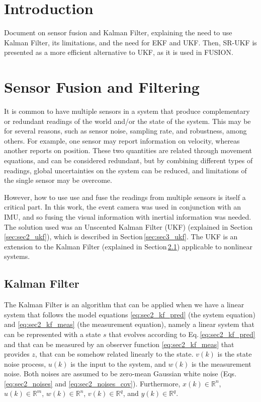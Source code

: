 \documentclass[10pt,twocolumn]{IEEEtran}
\begin{document}
\section{Introduction}

Document on sensor fusion and Kalman Filter, explaining the need to use Kalman Filter, its limitations, and the need for EKF and UKF. Then, SR-UKF is presented as a more efficient alternative to UKF, as it is used in FUSION.

\section{Sensor Fusion and Filtering}
\label{sec:sec_filtering}

It is common to have multiple sensors in a system that produce complementary or redundant readings of the world and/or the state of the system. This may be for several reasons, such as sensor noise, sampling rate, and robustness, among others. For example, one sensor may report information on velocity, whereas another reports on position. These two quantities are related through movement equations, and can be considered redundant, but by combining different types of readings, global uncertainties on the system can be reduced, and limitations of the single sensor may be overcome.

However, how to use use and fuse the readings from multiple sensors is itself a critical part. In this work, the event camera was used in conjunction with an IMU, and so fusing the visual information with inertial information was needed. The solution used was an Unscented Kalman Filter (UKF) (explained in Section\,\ref{sec:sec2_ukf}), which is described in Section\,\ref{sec:sec3_ukf}. The UKF is an extension to the Kalman Filter (explained in Section\,\ref{sec:sec2_kf}) applicable to nonlinear systems.

\subsection{Kalman Filter}
\label{sec:sec2_kf}

The Kalman Filter \cite{kalman1960new} is an algorithm that can be applied when we have a linear system that follows the model equations \eqref{eq:sec2_kf_pred} (the system equation) and \eqref{eq:sec2_kf_meas} (the measurement equation), namely a linear system that can be represented with a state $s$ that evolves according to Eq.\,\eqref{eq:sec2_kf_pred} and that can be measured by an observer function \eqref{eq:sec2_kf_meas} that provides $z$, that can be somehow related linearly to the state. $v(k)$ is the state noise process, $u(k)$ is the input to the system, and $w(k)$ is the measurement noise. Both noises are assumed to be zero-mean Gaussian white noise (Eqs.\,\eqref{eq:sec2_noises} and \eqref{eq:sec2_noises_cov}). Furthermore, $x(k) \in \mathbb{R} ^n$, $u(k) \in \mathbb{R} ^m$, $w(k) \in \mathbb{R} ^n$, $v(k) \in \mathbb{R} ^q$, and $y(k) \in \mathbb{R} ^q$.
\end{document}
